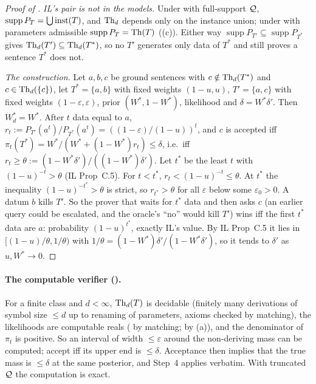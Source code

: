 \begin{proof}[Proof of ]
\emph{IL's pair is not in the models.} Under \Lzero{} with full-support $\mathcal{Q}$, $\operatorname{supp}P_T=\bigcup\mathrm{inst}(T)$, and $\mathrm{Th}_d$ depends only on the instance union; under \Lone{} with parameters admissible $\operatorname{supp}P_T=\mathrm{Th}(T)$ ((c)). Either way $\operatorname{supp}P_{T'}\subseteq\operatorname{supp}P_{T^*}$ gives $\mathrm{Th}_d(T')\subseteq\mathrm{Th}_d(T^*)$, so no $T'$ generates only data of $T^*$ and still proves a sentence $T^*$ does not.

\emph{The construction.} Let $a,b,c$ be ground sentences with $c\notin\mathrm{Th}_d(T^*)$ and $c\in\mathrm{Th}_d(\{c\})$, let $T^*=\{a,b\}$ with fixed weights $(1-u,u)$, $T'=\{a,c\}$ with fixed weights $(1-\varepsilon,\varepsilon)$, prior $(W^*,1-W^*)$, likelihood \Lzero{} and $\delta=W^*\delta'$. Then $W^*_d=W^*$. After $t$ data equal to $a$, $r_t:=P_{T'}(a^t)/P_{T^*}(a^t)=((1-\varepsilon)/(1-u))^t$, and $c$ is accepted iff $\pi_t(T^*)=W^*/(W^*+(1-W^*)r_t)\le\delta$, i.e.\ iff $r_t\ge\theta:=(1-W^*\delta')/((1-W^*)\delta')$. Let $t^*$ be the least $t$ with $(1-u)^{-t}>\theta$ (IL Prop~C.5). For $t<t^*$, $r_t<(1-u)^{-t}\le\theta$. At $t^*$ the inequality $(1-u)^{-t^*}>\theta$ is strict, so $r_{t^*}>\theta$ for all $\varepsilon$ below some $\varepsilon_0>0$. A datum $b$ kills $T'$. So the prover that waits for $t^*$ data and then asks $c$ (an earlier query could be escalated, and the oracle's ``no'' would kill $T'$) wins iff the first $t^*$ data are $a$: probability $(1-u)^{t^*}$, exactly IL's value. By IL Prop~C.5 it lies in $[(1-u)/\theta,1/\theta)$ with $1/\theta=(1-W^*)\delta'/(1-W^*\delta')$, so it tends to $\delta'$ as $u,W^*\to0$.
\end{proof}

\paragraph{The computable verifier ().} For a finite class and $d<\infty$, $\mathrm{Th}_d(T)$ is decidable (finitely many derivations of symbol size $\le d$ up to renaming of parameters, axioms checked by matching), the likelihoods are computable reals (\Lzero{} by matching; \Lone{} by (a)), and the denominator of $\pi_t$ is positive. So an interval of width $\le\varepsilon$ around the non-deriving mass can be computed; accept iff its upper end is $\le\delta$. Acceptance then implies that the true mass is $\le\delta$ at the same posterior, and Step~4 applies verbatim. With truncated $\mathcal{Q}$ the computation is exact.

